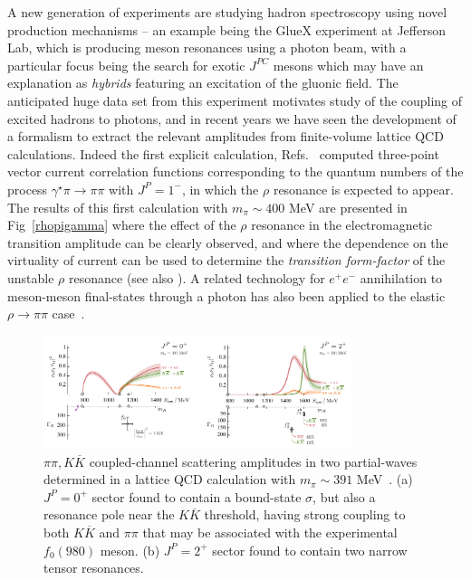 A new generation of experiments are studying hadron spectroscopy using novel production mechanisms -- an example being the GlueX experiment at Jefferson Lab, which is producing meson resonances using a photon beam, with a particular focus being the search for exotic $J^{PC}$  mesons which may have an explanation as \emph{hybrids} featuring an excitation of the gluonic field. The anticipated huge data set from this experiment motivates study of the coupling of excited hadrons to photons, and in recent years we have seen the development of a formalism to extract the relevant amplitudes from finite-volume lattice QCD calculations. Indeed the first explicit calculation, Refs.~\cite{Briceno:2015dca,Briceno:2016kkp} computed three-point vector current correlation functions corresponding to the quantum numbers of the process $\gamma^\star \pi \to \pi \pi$ with $J^P=1^-$, in which the $\rho$ resonance is expected to appear. The results of this first calculation with $m_\pi \sim 400$ MeV are presented in Fig~\ref{rhopigamma} where the effect of the $\rho$ resonance in the electromagnetic transition amplitude can be clearly observed, and where the dependence on the virtuality of current can be used to determine the \emph{transition form-factor} of the unstable $\rho$ resonance (see also \cite{Alexandrou:2018jbt}). A related technology for $e^+ e^-$ annihilation to meson-meson final-states through a photon has also been applied to the elastic $\rho \to \pi\pi$ case~\cite{Feng:2014gba}.

 
\begin{figure}
\includegraphics[width=0.8\textwidth]{figures/f0f2}
\caption{$\pi\pi, K\overline{K}$ coupled-channel scattering amplitudes in two partial-waves determined in a lattice QCD calculation with $m_\pi \sim 391$ MeV~\cite{Briceno:2017qmb}. (a) $J^P=0^+$ sector found to contain a bound-state $\sigma$, but also a resonance pole near the $K\overline{K}$ threshold, having strong coupling to both $K\overline{K}$ and $\pi\pi$ that may be associated with the experimental $f_0(980)$ meson. (b) $J^P=2^+$ sector found to contain two narrow tensor resonances.}
\label{f0f2}
\end{figure}


